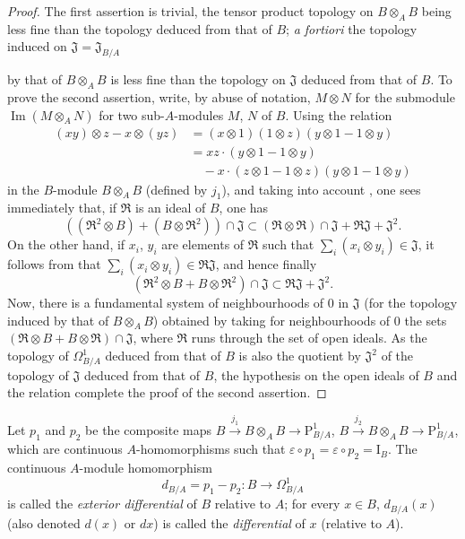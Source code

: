 \begin{proof}
The first assertion is trivial, the tensor product topology on $B\otimes_A B$ being less fine than the topology deduced from that of $B$; \emph{a fortiori} the topology induced on $\mathfrak{J}=\mathfrak{J}_{B/A}$

by that of $B\otimes_A B$ is less fine than the topology on $\mathfrak{J}$ deduced from that of $B$.
To prove the second assertion, write, by abuse of notation, $M\otimes N$ for the submodule $\operatorname{Im}(M\otimes_A N)$ for two sub-$A$-modules $M$, $N$ of $B$.
Using the relation
\[
  \begin{aligned}
  (xy)\otimes z-x\otimes(yz)
  &=(x\otimes 1)(1\otimes z)(y\otimes 1-1\otimes y)\\
  &=xz\cdot(y\otimes 1-1\otimes y)\\
  &\quad-x\cdot(z\otimes 1-1\otimes z)(y\otimes 1-1\otimes y)
  \end{aligned}
\]
in the $B$-module $B\otimes_A B$ (defined by $j_1$), and taking into account , one sees immediately that, if $\mathfrak{R}$ is an ideal of $B$, one has
\[
  ((\mathfrak{R}^2\otimes B)+(B\otimes\mathfrak{R}^2))\cap\mathfrak{J}
  \subset(\mathfrak{R}\otimes\mathfrak{R})\cap\mathfrak{J}
  +\mathfrak{R}\mathfrak{J}+\mathfrak{J}^2.
\]
On the other hand, if $x_i$, $y_i$ are elements of $\mathfrak{R}$ such that
$\sum_i(x_i\otimes y_i)\in\mathfrak{J}$, it follows from
 that $\sum_i(x_i\otimes y_i)\in\mathfrak{R}\mathfrak{J}$,
and hence finally
\begin{equation}
\tag{20.4.5.1}
  \label{0.20.4.5.1}
  (\mathfrak{R}^2\otimes B+B\otimes\mathfrak{R}^2)\cap\mathfrak{J}\subset\mathfrak{R}\mathfrak{J}+\mathfrak{J}^2.
\end{equation}
Now, there is a fundamental system of neighbourhoods of $0$ in $\mathfrak{J}$ (for the topology induced by that of $B\otimes_A B$) obtained by taking for neighbourhoods of $0$ the sets $(\mathfrak{R}\otimes B+B\otimes\mathfrak{R})\cap\mathfrak{J}$, where $\mathfrak{R}$ runs through the set of open ideals.
As the topology of $\Omega^1_{B/A}$ deduced from that of $B$ is also the quotient by $\mathfrak{J}^2$ of the topology of $\mathfrak{J}$ deduced from that of $B$, the hypothesis on the open ideals of $B$ and the relation  complete the proof of the second assertion.
\end{proof}

\begin{definition}[20.4.6]
\label{0.20.4.6}
Let $p_1$ and $p_2$ be the composite maps $B\xrightarrow{j_1}B\otimes_A B\to\mathrm{P}^1_{B/A}$, $B\xrightarrow{j_2}B\otimes_A B\to\mathrm{P}^1_{B/A}$, which are continuous $A$-homomorphisms such that $\varepsilon\circ p_1=\varepsilon\circ p_2=\mathrm{I}_B$.
The continuous $A$-module homomorphism
\begin{equation}
\tag{20.4.6.1}
  \label{0.20.4.6.1}
  d_{B/A} = p_1-p_2:B\to\Omega^1_{B/A}
\end{equation}
is called the \emph{exterior differential} of $B$ relative to $A$; for every $x\in B$, $d_{B/A}(x)$ (also denoted $d(x)$ or $dx$) is called the \emph{differential} of $x$ (relative to $A$).
\end{definition}

